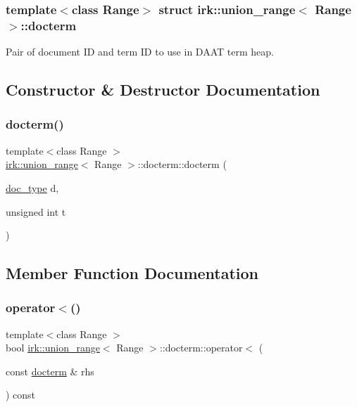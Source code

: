 \subsubsection*{template$<$class Range$>$\newline
struct irk\+::union\+\_\+range$<$ Range $>$\+::docterm}

Pair of document ID and term ID to use in D\+A\+AT term heap. 

\subsection{Constructor \& Destructor Documentation}
\mbox{\label{structirk_1_1union__range_1_1docterm_a88cf1e49c5dec4a5508de4215fe084fb}} 
\subsubsection{\texorpdfstring{docterm()}{docterm()}}
{\footnotesize\ttfamily template$<$class Range $>$ \\
\mbox{\hyperlink{classirk_1_1union__range}{irk\+::union\+\_\+range}}$<$ Range $>$\+::docterm\+::docterm (\begin{DoxyParamCaption}\item[{\mbox{\hyperlink{classirk_1_1union__range_aa502a10f2f5c682199072c0ba11a77a9}{doc\+\_\+type}}}]{d,  }\item[{unsigned int}]{t }\end{DoxyParamCaption})\hspace{0.3cm}{\ttfamily [inline]}}



\subsection{Member Function Documentation}
\mbox{\label{structirk_1_1union__range_1_1docterm_accee80a1089a0fa164de5b7e682ec771}} 
\subsubsection{\texorpdfstring{operator$<$()}{operator<()}}
{\footnotesize\ttfamily template$<$class Range $>$ \\
bool \mbox{\hyperlink{classirk_1_1union__range}{irk\+::union\+\_\+range}}$<$ Range $>$\+::docterm\+::operator$<$ (\begin{DoxyParamCaption}\item[{const \mbox{\hyperlink{structirk_1_1union__range_1_1docterm}{docterm}} \&}]{rhs }\end{DoxyParamCaption}) const\hspace{0.3cm}{\ttfamily [inline]}}

